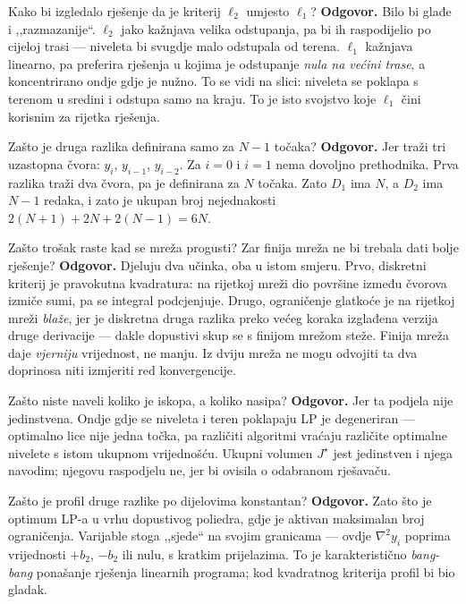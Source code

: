 \begin{pitanje}{Kako bi izgledalo rješenje da je kriterij $\ell_2$ umjesto $\ell_1$?}
\textbf{Odgovor.} Bilo bi glađe i ,,razmazanije``. $\ell_2$ jako kažnjava velika
odstupanja, pa bi ih raspodijelio po cijeloj trasi --- niveleta bi svugdje malo
odstupala od terena. $\ell_1$ kažnjava linearno, pa preferira rješenja u kojima
je odstupanje \emph{nula na većini trase}, a koncentrirano ondje gdje je nužno.
To se vidi na slici: niveleta se poklapa s terenom u sredini i odstupa samo na
kraju. To je isto svojstvo koje $\ell_1$ čini korisnim za rijetka rješenja.
\end{pitanje}

\begin{pitanje}{Zašto je druga razlika definirana samo za $N-1$ točaka?}
\textbf{Odgovor.} Jer traži tri uzastopna čvora: $y_i$, $y_{i-1}$, $y_{i-2}$. Za
$i = 0$ i $i = 1$ nema dovoljno prethodnika. Prva razlika traži dva čvora, pa je
definirana za $N$ točaka. Zato $D_1$ ima $N$, a $D_2$ ima $N-1$ redaka, i zato je
ukupan broj nejednakosti $2(N+1) + 2N + 2(N-1) = 6N$.
\end{pitanje}

\begin{pitanje}{Zašto trošak raste kad se mreža progusti? Zar finija mreža ne bi trebala dati bolje rješenje?}
\textbf{Odgovor.} Djeluju dva učinka, oba u istom smjeru. Prvo, diskretni
kriterij je pravokutna kvadratura: na rijetkoj mreži dio površine između čvorova
izmiče sumi, pa se integral podcjenjuje. Drugo, ograničenje glatkoće je na
rijetkoj mreži \emph{blaže}, jer je diskretna druga razlika preko većeg koraka
izglađena verzija druge derivacije --- dakle dopustivi skup se s finijom mrežom
steže. Finija mreža daje \emph{vjerniju} vrijednost, ne manju. Iz dviju mreža ne
mogu odvojiti ta dva doprinosa niti izmjeriti red konvergencije.
\end{pitanje}

\begin{pitanje}{Zašto niste naveli koliko je iskopa, a koliko nasipa?}
\textbf{Odgovor.} Jer ta podjela nije jedinstvena. Ondje gdje se niveleta i
teren poklapaju LP je degeneriran --- optimalno lice nije jedna točka, pa
različiti algoritmi vraćaju različite optimalne nivelete s istom ukupnom
vrijednošću. Ukupni volumen $J^{\star}$ jest jedinstven i njega navodim; njegovu
raspodjelu ne, jer bi ovisila o odabranom rješavaču.
\end{pitanje}

\begin{pitanje}{Zašto je profil druge razlike po dijelovima konstantan?}
\textbf{Odgovor.} Zato što je optimum LP-a u vrhu dopustivog poliedra, gdje je
aktivan maksimalan broj ograničenja. Varijable stoga ,,sjede`` na svojim
granicama --- ovdje $\nabla^2 y_i$ poprima vrijednosti $+b_2$, $-b_2$ ili nulu, s
kratkim prijelazima. To je karakteristično \emph{bang-bang} ponašanje rješenja
linearnih programa; kod kvadratnog kriterija profil bi bio gladak.
\end{pitanje}


